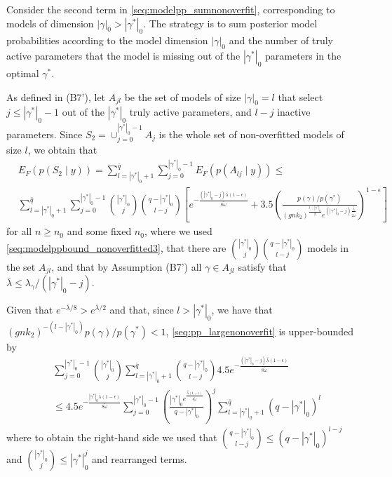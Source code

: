 Consider the second term in \eqref{seq:modelpp_sumnonoverfit}, corresponding to models of dimension $|\gamma|_0 > |\gamma^*|_0$.
The strategy is to sum posterior model probabilities according to the model dimension $|\gamma|_0$ and the number of truly active parameters that the model is missing out of the $|\gamma^*|_0$ parameters in the optimal $\gamma^*$.

As defined in (B7'), let $A_{jl}$ be the set of models of size $|\gamma|_0=l$ that select $j \leq |\gamma^*|_0-1$ out of the $|\gamma^*|_0$ truly active parameters, and $l-j$ inactive parameters.
Since $S_2=\cup_{j=0}^{|\gamma^*|_0-1} A_j$ is the whole set of non-overfitted models of size $l$, we obtain that
\begin{align}
&E_F(p(S_2 \mid y)) = \sum_{l=|\gamma^*|_0+1}^{\bar{q}} \sum_{j=0}^{|\gamma^*|_0-1} E_F(p(A_{lj} \mid y)) \leq
\nonumber \\
& \sum_{l=|\gamma^*|_0+1}^{\bar{q}} \sum_{j=0}^{|\gamma^*|_0-1}
{|\gamma^*|_0 \choose j} {q - |\gamma^*|_0 \choose l-j}
\left[ e^{ -\frac{(|\gamma^*|_0-j)\bar{\lambda}(1-\epsilon)}{ 8\tilde{\omega}}}
+ 3.5 \left( \frac{ p(\gamma)/p(\gamma^*) }{(gnk_2)^{\frac{l - |\gamma^*|_0}{2}} e^{(|\gamma^*|_0-j)\frac{\bar{\lambda}}{2 \tilde{\omega}}}} \right)^{1-\epsilon} \right]
\label{seq:pp_largenonoverfit}
\end{align}
for all $n \geq n_0$ and some fixed $n_0$,
where we used \eqref{seq:modelppbound_nonoverfitted3},
that there are ${|\gamma^*|_0 \choose j}{q - |\gamma^*|_0 \choose l -j }$ models in the set $A_{jl}$,
and that by Assumption (B7') all $\gamma \in A_{jl}$ satisfy that $\bar{\lambda} \leq \lambda_\gamma/(|\gamma^*|_0-j)$.




Given that $e^{-\bar{\lambda}/8} > e^{\bar{\lambda}/2}$ and that, since $l > |\gamma^*|_0$, we have that $(gnk_2)^{-(l-|\gamma^*|_0)} p(\gamma)/p(\gamma^*) < 1$, 
\eqref{seq:pp_largenonoverfit} is upper-bounded by
\begin{align}
& \sum_{j=0}^{|\gamma^*|_0-1} {|\gamma^*|_0 \choose j} \sum_{l=|\gamma^*|_0+1}^{\bar{q}} 
 {q - |\gamma^*|_0 \choose l-j}
4.5 e^{ -\frac{(|\gamma^*|_0-j)\bar{\lambda}(1-\epsilon)}{ 8\tilde{\omega}}}
\nonumber \\
&\leq 
4.5 e^{ -\frac{|\gamma^*|_0\bar{\lambda}(1-\epsilon)}{ 8\tilde{\omega}}}
 \sum_{j=0}^{|\gamma^*|_0-1} \left( \frac{|\gamma^*|_0 e^{ \frac{\bar{\lambda}(1-\epsilon)}{ 8\tilde{\omega}}}}{q - |\gamma^*|_0} \right)^j  
\sum_{l=|\gamma^*|_0+1}^{\bar{q}} (q - |\gamma^*|_0)^{l}
\label{seq:pp_largenonoverfit2}
\end{align}
where to obtain the right-hand side we used that ${q - |\gamma^*|_0 \choose l - j} \leq (q-|\gamma^*|_0)^{l-j}$ and ${|\gamma^*|_0 \choose j} \leq |\gamma^*|_0^j$ and rearranged terms.


